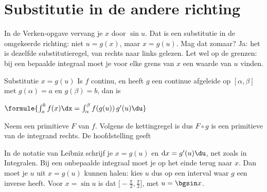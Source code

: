 \begin{oefeningen}[Start]

\end{oefeningen}


\section{Substitutie in de andere richting}

In de Verken-opgave vervang je $x$ door $\sin u$. Dat is een substitutie in de omgekeerde richting: niet $u = g(x)$, maar $x = g(u)$. Mag dat zomaar? Ja: het is dezelfde substitutieregel, van rechts naar links gelezen. Let wel op de grenzen: bij een bepaalde integraal moet je voor elke grens van $x$ een waarde van $u$ vinden.

\begin{theorie}
\begin{stelling}{Substitutie $x = g(u)$}
Is $f$ continu, en heeft $g$ een continue afgeleide op $[\alpha, \beta]$ met $g(\alpha) = a$ en $g(\beta) = b$, dan is

\vspace{1mm}
\qquad $\formule{\int_a^b f(x)\dx = \int_\alpha^\beta f(g(u))\,g'(u)\du}$
\end{stelling}

\begin{bewijs}
Neem een primitieve $F$ van $f$. Volgens de kettingregel is
dus $F \circ g$ is een primitieve van de integrand rechts. De hoofdstelling geeft
\end{bewijs}
\end{theorie}

In de notatie van Leibniz schrijf je $x = g(u)$ en $\mathrm{d}x = g'(u)\du$, net zoals in Integralen. Bij een onbepaalde integraal moet je op het einde terug naar $x$. Dan moet je $u$ uit $x = g(u)$ kunnen halen: kies $u$ dus op een interval waar $g$ een inverse heeft. Voor $x = \sin u$ is dat $\bigl[-\tfrac{\pi}{2}, \tfrac{\pi}{2}\bigr]$, met $u = \bgsin x$.

